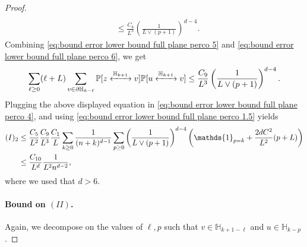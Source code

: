 \documentclass[11pt,a4paper]{article}
\numberwithin{equation}{section}
\theoremstyle{plain}
\theoremstyle{definition}
\newcommand{\connect}{\xleftrightarrow}
\begin{document}
\begin{proof}
\begin{align}
\\&\leq \frac{C_8}{L^3}\left(\frac{1}{L\vee (p+1)}\right)^{d-4}.\label{eq:bound error lower bound full plane perco 6}
\end{align}
Combining \eqref{eq:bound error lower bound full plane perco 5} and \eqref{eq:bound error lower bound full plane perco 6}, we get
\begin{equation}
	\sum_{\ell\geq 0}(\ell+L)\sum_{v\in \partial \mathbb H_{k-\ell}}\mathbb P[z\connect{\mathbb H_{k+1}\:}v]\mathbb P[u\connect{\mathbb H_{k+1}\:}v]\leq \frac{C_9}{L^3}\left(\frac{1}{L\vee (p+1)}\right)^{d-4}.
\end{equation}
Plugging the above displayed equation in \eqref{eq:bound error lower bound full plane perco 4}, and using \eqref{eq:bound error lower bound full plane perco 1.5} yields
\begin{align}
	(I)_2&\leq \frac{C_{5}}{L^2}\frac{C_9}{L^3}\frac{C_1}{L}\sum_{k\geq 0}\frac{1}{(n+k)^{d-1}}\sum_{p\geq 0}\left(\frac{1}{L\vee (p+1)}\right)^{d-4}\left(\mathds{1}_{p=k}+\frac{2dC^2}{L^2}(p+L)\right)\notag
	\\&\leq \frac{C_{10}}{L^d}\frac{1}{L^2n^{d-2}},\label{eq: I 2}
\end{align}
where we used that $d>6$.
\paragraph{Bound on $(II)$.} Again, we decompose on the values of $\ell,p$ such that $v\in \mathbb H_{k+1-\ell}$ and $u\in \mathbb H_{k-p}$. 


\end{proof}
\end{document}
